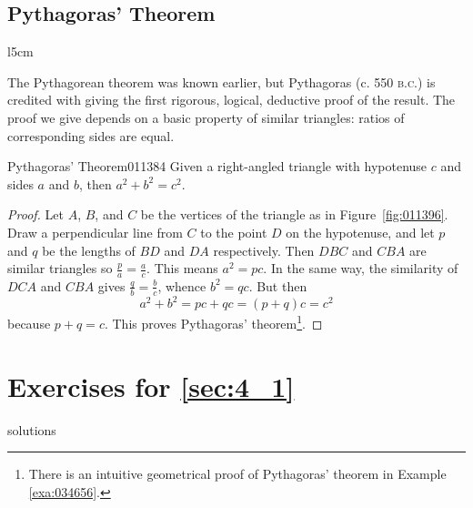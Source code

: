 \subsection*{Pythagoras' Theorem}

\begin{wrapfigure}[4]{l}{5cm} 
\centering

\caption{\label{fig:011396}}
\end{wrapfigure}
The Pythagorean theorem was known earlier, but Pythagoras (c. 550 \textsc{b.c.})
 is credited with giving the first rigorous, logical, deductive proof of
 the result. The proof we give depends on a basic property of similar 
triangles: ratios of corresponding sides are equal.
\vspace{4em}

\begin{theorem}{Pythagoras' Theorem}{011384}
Given a right-angled triangle with hypotenuse $c$ and sides $a$ and $b$, then $a^{2} + b^{2} = c^{2}$.
\end{theorem}

\begin{proof}
Let $A$, $B$, and $C$ be the vertices of the triangle as in Figure~\ref{fig:011396}. Draw a perpendicular line from $C$ to the point $D$ on the hypotenuse, and let $p$ and $q$ be the lengths of $BD$ and $DA$ respectively. Then $DBC$ and $CBA$ are similar triangles so $\frac{p}{a} = \frac{a}{c}$. This means $a^{2} = pc$. In the same way, the similarity of $DCA$ and $CBA$ gives $\frac{q}{b} = \frac{b}{c}$, whence $b^{2} = qc$. But then
\begin{equation*}
a^2 + b^2 = pc + qc = (p +q)c = c^2
\end{equation*}
because $p + q = c$. This proves Pythagoras' theorem\footnote{There is an intuitive geometrical proof of Pythagoras' theorem in Example \ref{exa:034656}.}.
\end{proof}

\section*{Exercises for \ref{sec:4_1}}

\begin{Filesave}{solutions}
\end{Filesave}

